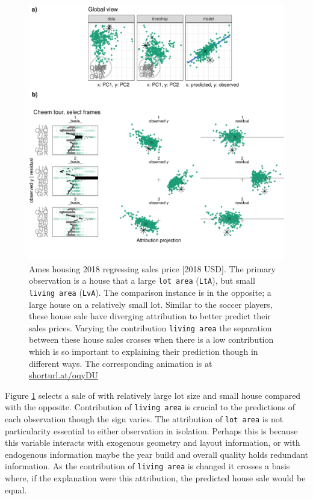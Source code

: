 \documentclass[
]{article}
\begin{document}
\begin{figure}

{\centering \includegraphics[width=1\linewidth]{./figures/case_ames2018} 

}

\caption{Ames housing 2018 regressing sales price {[}2018 USD{]}. The primary observation is a house that a large \texttt{lot\ area} (\texttt{LtA}), but small \texttt{living\ area} (\texttt{LvA}). The comparison instance is in the opposite; a large house on a relatively small lot. Similar to the soccer players, these house sale have diverging attribution to better predict their sales prices. Varying the contribution \texttt{living\ area} the separation between these house sales crosses when there is a low contribution which is so important to explaining their prediction though in different ways. The corresponding animation is at \href{https://github.com/nspyrison/cheem_paper/blob/main/figures/case_ames2018.mp4}{shorturl.at/oqyDU}}\label{fig:caseames}
\end{figure}

Figure \ref{fig:caseames} selects a sale of with relatively large lot size and small house compared with the opposite. Contribution of \texttt{living\ area} is crucial to the predictions of each observation though the sign varies. The attribution of \texttt{lot\ area} is not particularity essential to either observation in isolation. Perhaps this is because this variable interacts with exogenous geometry and layout information, or with endogenous information maybe the year build and overall quality holds redundant information. As the contribution of \texttt{living\ area} is changed it crosses a basis where, if the explanation were this attribution, the predicted house sale would be equal.
\end{document}
